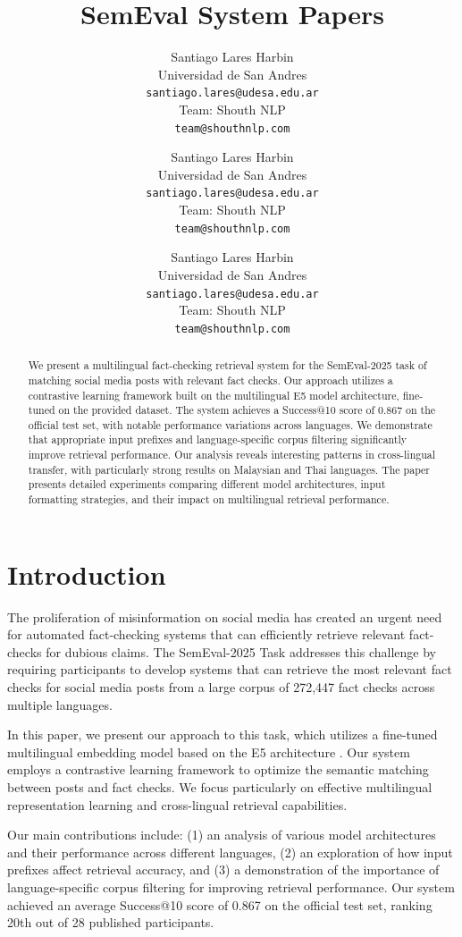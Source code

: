 \documentclass[11pt]{article}
\title{SemEval System Papers}
\author{Santiago Lares Harbin \\
  Universidad de San Andres \\
  \texttt{santiago.lares@udesa.edu.ar} \\\And
  Team: Shouth NLP \\
  \texttt{team@shouthnlp.com} \\}
\date{Santiago Lares Harbin \\ Universidad de San Andres \\ \texttt{santiago.lares@udesa.edu.ar} \\ Team: Shouth NLP \\ \texttt{team@shouthnlp.com}}
\author{Santiago Lares Harbin \\
  Universidad de San Andres \\
  \texttt{santiago.lares@udesa.edu.ar} \\\And
  Team: Shouth NLP \\
  \texttt{team@shouthnlp.com} \\}
\begin{document}
\maketitle
\begin{abstract}
We present a multilingual fact-checking retrieval system for the SemEval-2025 task of matching social media posts with relevant fact checks. Our approach utilizes a contrastive learning framework built on the multilingual E5 model architecture, fine-tuned on the provided dataset. The system achieves a Success@10 score of 0.867 on the official test set, with notable performance variations across languages. We demonstrate that appropriate input prefixes and language-specific corpus filtering significantly improve retrieval performance. Our analysis reveals interesting patterns in cross-lingual transfer, with particularly strong results on Malaysian and Thai languages. The paper presents detailed experiments comparing different model architectures, input formatting strategies, and their impact on multilingual retrieval performance.
\end{abstract}

\section{Introduction}

The proliferation of misinformation on social media has created an urgent need for automated fact-checking systems that can efficiently retrieve relevant fact-checks for dubious claims. The SemEval-2025 Task \cite{sebi2025multilingual} addresses this challenge by requiring participants to develop systems that can retrieve the most relevant fact checks for social media posts from a large corpus of 272,447 fact checks across multiple languages.

In this paper, we present our approach to this task, which utilizes a fine-tuned multilingual embedding model based on the E5 architecture \cite{wang2024multilingual}. Our system employs a contrastive learning framework to optimize the semantic matching between posts and fact checks. We focus particularly on effective multilingual representation learning and cross-lingual retrieval capabilities.

Our main contributions include: (1) an analysis of various model architectures and their performance across different languages, (2) an exploration of how input prefixes affect retrieval accuracy, and (3) a demonstration of the importance of language-specific corpus filtering for improving retrieval performance. Our system achieved an average Success@10 score of 0.867 on the official test set, ranking 20th out of 28 published participants.
\end{document}
